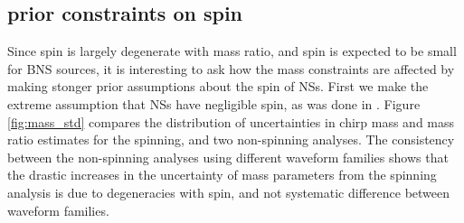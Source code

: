 \subsection{prior constraints on spin}
\label{subsec:prior_constraints}

Since spin is largely degenerate with mass ratio, and spin is expected to be small for BNS sources, it is interesting to ask how the mass constraints are affected by making stonger prior assumptions about the spin of NSs.  First we make the extreme assumption that NSs have negligible spin, as was done in \citet{Singer_2014}.  Figure \ref{fig:mass_std} compares the distribution of uncertainties in chirp mass and mass ratio estimates for the spinning, and two non-spinning analyses.  The consistency between the non-spinning analyses using different waveform families shows that the drastic increases in the uncertainty of mass parameters from the spinning analysis is due to degeneracies with spin, and not systematic difference between waveform families.